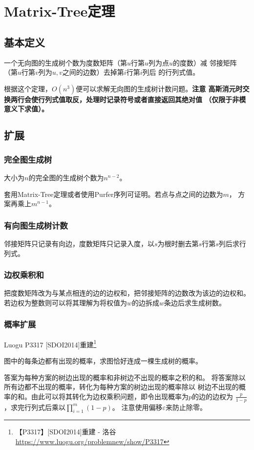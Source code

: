 \section{Matrix-Tree定理}
\subsection{基本定义}
\begin{theorem}
	一个无向图的生成树个数为度数矩阵（第$u$行第$u$列为点$u$的度数）减
	邻接矩阵（第$u$行第$v$列为$u,v$之间的边数）去掉第$i$行第$i$列后
	的行列式值。
\end{theorem}
根据这个定理，$O(n^3)$便可以求解无向图的生成树计数问题。{\bfseries 注意
高斯消元时交换两行会使行列式值取反，处理时记录符号或者直接返回其绝对值
（仅限于非模意义下求值）。}
\subsection{扩展}
\subsubsection{完全图生成树}
\begin{theorem}
	大小为$n$的完全图的生成树个数为$n^{n-2}$。
\end{theorem}
套用Matrix-Tree定理或者使用Purfer序列可证明。若点与点之间的边数为$m$，
方案再乘上$m^{n-1}$。
\subsubsection{有向图生成树计数}
邻接矩阵只记录有向边，度数矩阵只记录入度，以$s$为根时删去第$s$行第$s$列后求行列式。
\subsubsection{边权乘积和}
把度数矩阵改为与某点相连的边的边权和，把邻接矩阵的边数改为该边的边权和。
若边权为整数则可以将其理解为将权值为$w$的边拆成$w$条边后求生成树数。
\subsubsection{概率扩展}
Luogu P3317 [SDOI2014]重建\footnote{【P3317】[SDOI2014]重建 - 洛谷
\url{https://www.luogu.org/problemnew/show/P3317}
}

图中的每条边都有出现的概率，求图恰好连成一棵生成树的概率。

答案为每种方案的树边出现的概率和非树边不出现的概率之积的和。
将答案除以所有边都不出现的概率，转化为每种方案的树边出现的概率除以
树边不出现的概率的和。由此可以将其转化为边权乘积问题，即令出现概率为$p$的边的边权为
$\frac{p}{1-p}$，求完行列式后乘以$\displaystyle \prod_{i=1}^m{(1-p)}$。
注意使用偏移$\varepsilon$来防止除零。

